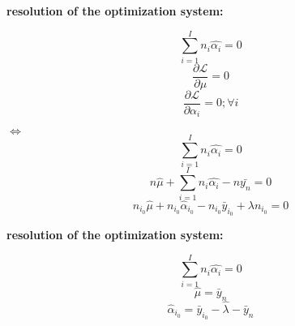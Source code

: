 \documentclass[unknownkeysallowed]{beamer}
\begin{document}
\begin{frame}
\bigskip
\bigskip
\begin{center}{
\LARGE\color{marron}
\textbf{resolution of the optimization system:}
\textbf{ }\\

}

\color{marron}
\end{center}



        $$\sum\limits_{i=1}^{I}n_i \hat{\alpha_i}=0$$
        $$\frac{\partial \mathcal{L}}{\partial \mu}=0 $$
        $$\frac{\partial \mathcal{L}}{\partial \alpha_i}=0; \forall i$$



$\Leftrightarrow$  \\


        $$\sum\limits_{i=1}^{I}n_i\hat{\alpha_i}=0 $$
        $$ n\hat{\mu}+ \sum\limits_{i=1}^I n_i\hat{\alpha_i}-n\bar{y_n}=0$$
        $$ n_{i_0} \hat{\mu} + n_{i_0} \hat{\alpha}_{i_0}-n_{i_0}\bar{y}_{i_0}+\lambda n_{i_0} = 0$$




\end{frame}

\begin{frame}
\bigskip
\bigskip
\begin{center}{
\LARGE\color{marron}
\textbf{resolution of the optimization system:}
\textbf{ }\\

}

\color{marron}
\end{center}



        $$\sum\limits_{i=1}^{I}n_i \hat{\alpha_i}=0$$
        $$\hat{\mu}=\bar{y}_n $$
        $$ \hat{\alpha}_{i_0} = \bar{y}_{i_0}-\hat{\lambda}-\bar{y}_n$$





\end{frame}
\end{document}
